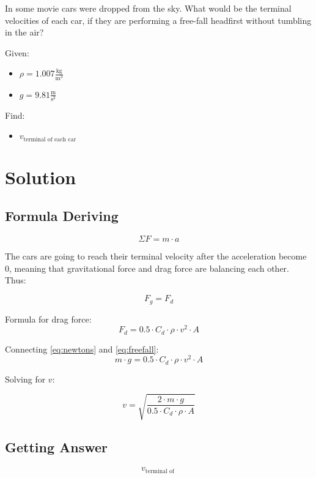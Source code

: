 
In some movie cars were dropped from the sky.
What would be the terminal velocities of each car, if they are
performing a free-fall headfirst without tumbling in the air?

\bigbreak Given:
\begin{itemize}
    \item $ \rho = 1.007 \frac{\text{kg}}{\text{m}^3} $
    \item $ g = 9.81 \frac{\text{m}}{\text{s}^2} $
\end{itemize}

Find:
\begin{itemize}
    \item $ v_{\text{terminal of each car}} $
\end{itemize}


\section*{Solution}
\subsection*{Formula Deriving}

\begin{equation}
    \label{eq:newtons}
    \Sigma F = m \cdot a
\end{equation}

The cars are going to reach their terminal velocity after the acceleration become 0,
meaning that gravitational force and drag force are balancing each other. Thus:

$$ F_g = F_d $$

Formula for drag force:
\begin{equation}
    \label{eq:freefall}
    F_d = 0.5 \cdot C_d \cdot \rho \cdot v^2 \cdot A
\end{equation}

Connecting \ref{eq:newtons} and \ref{eq:freefall}:
$$m \cdot g = 0.5 \cdot C_d \cdot \rho \cdot v^2 \cdot A $$

Solving for $v$:

\begin{equation}
    \label{eq:terminal}
    v = \sqrt{\frac{2 \cdot m \cdot g}{0.5 \cdot C_d \cdot \rho \cdot A}}
\end{equation}

\subsection*{Getting Answer}

$$ v_{\text{terminal of }} $$